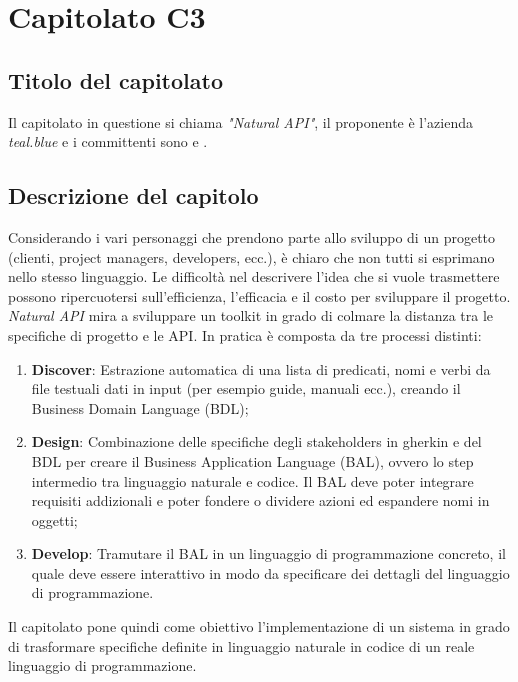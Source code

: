 \section{Capitolato C3}
\subsection{Titolo del capitolato}
Il capitolato in questione si chiama \textit{"Natural API"}, il proponente è l'azienda \textit{teal.blue} e i committenti sono \VT{} e \CR{}.

\subsection{Descrizione del capitolo}
Considerando i vari personaggi che prendono parte allo sviluppo di un progetto (clienti, project managers, developers, ecc.), è chiaro che non tutti si esprimano nello stesso linguaggio. Le difficoltà nel descrivere l'idea che si vuole trasmettere possono ripercuotersi sull'efficienza, l'efficacia e il costo per sviluppare il progetto. \textit{Natural API} mira a sviluppare un toolkit in grado di colmare la distanza tra le specifiche di progetto e le API. In pratica è composta da tre processi distinti:
\begin{enumerate}
\item \textbf{Discover}: Estrazione automatica di una lista di predicati, nomi e verbi da file testuali dati in input (per esempio guide, manuali ecc.), creando il Business Domain Language (BDL);
\item \textbf{Design}: Combinazione delle specifiche degli stakeholders in gherkin e del BDL per creare il Business Application Language (BAL), ovvero lo step intermedio tra linguaggio naturale e codice. Il BAL deve poter integrare requisiti addizionali e poter fondere o dividere azioni ed espandere nomi in oggetti;
\item \textbf{Develop}: Tramutare il BAL in un linguaggio di programmazione concreto, il quale deve essere interattivo in modo da specificare dei dettagli del linguaggio di programmazione.
\end{enumerate}

Il capitolato pone quindi come obiettivo l'implementazione di un sistema in grado di trasformare specifiche definite in linguaggio naturale in codice di un reale linguaggio di programmazione.

